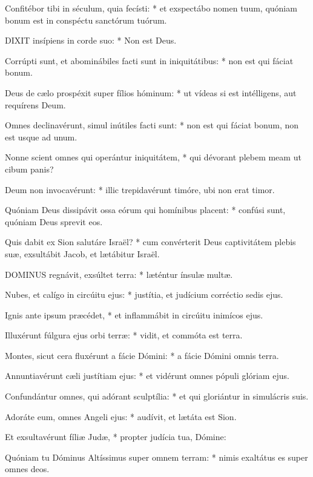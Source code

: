Confitébor tibi in séculum, quia fecísti: * et exspectábo nomen tuum, quóniam bonum est in conspéctu sanctórum tuórum.


\lettrine[lines=2]{D}{IXIT} insípiens in corde suo: * Non est Deus.

Corrúpti sunt, et abominábiles facti sunt in iniquitátibus: * non est qui fáciat bonum.

Deus de cælo prospéxit super fílios hóminum: * ut vídeas si est intélligens, aut requírens Deum.

Omnes declinavérunt, simul inútiles facti sunt: * non est qui fáciat bonum, non est usque ad unum.

Nonne scient omnes qui operántur iniquitátem, * qui dévorant plebem meam ut cibum panis?

Deum non invocavérunt: * illic trepidavérunt timóre, ubi non erat timor.

Quóniam Deus dissipávit ossa eórum qui homínibus placent: * confúsi sunt, quóniam Deus sprevit eos.

Quis dabit ex Sion salutáre Israël? * cum convérterit Deus captivitátem plebis suæ, exsultábit Jacob, et lætábitur Israël.



\lettrine[lines=2]{D}{OMINUS} regnávit, exsúltet terra: * læténtur ínsulæ multæ.

Nubes, et calígo in circúitu ejus: * justítia, et judícium corréctio sedis ejus.

Ignis ante ipsum præcédet, * et inflammábit in circúitu inimícos ejus.

Illuxérunt fúlgura ejus orbi terræ: * vidit, et commóta est terra.

Montes, sicut cera fluxérunt a fácie Dómini: * a fácie Dómini omnis terra.

Annuntiavérunt cæli justítiam ejus: * et vidérunt omnes pópuli glóriam ejus.

Confundántur omnes, qui adórant sculptília: * et qui gloriántur in simulácris suis.

Adoráte eum, omnes Angeli ejus: * audívit, et lætáta est Sion.

Et exsultavérunt fíliæ Judæ, * propter judícia tua, Dómine:

Quóniam tu Dóminus Altíssimus super omnem terram: * nimis exaltátus es super omnes deos.

